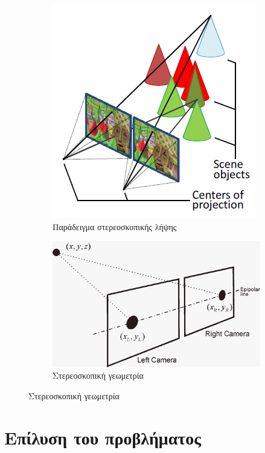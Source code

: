 \documentclass{article}
\begin{document}
\begin{figure}
	\centering
    \begin{subfigure}{0.5\textwidth}
    	\includegraphics[scale=0.4]{stereo_cameras.png}
    	\caption{Παράδειγμα στερεοσκοπικής λήψης}
    	\label{fig:stereo_cameras}
    \end{subfigure}
    \begin{subfigure}{0.49\textwidth}
        \centering
        \includegraphics[scale=0.4]{stereo_geometry.jpg}
        \caption{Στερεοσκοπική γεωμετρία}
        \label{fig:stereo_geometry}
    \end{subfigure}
\end{figure}



\section{Επίλυση του προβλήματος}
\end{document}
